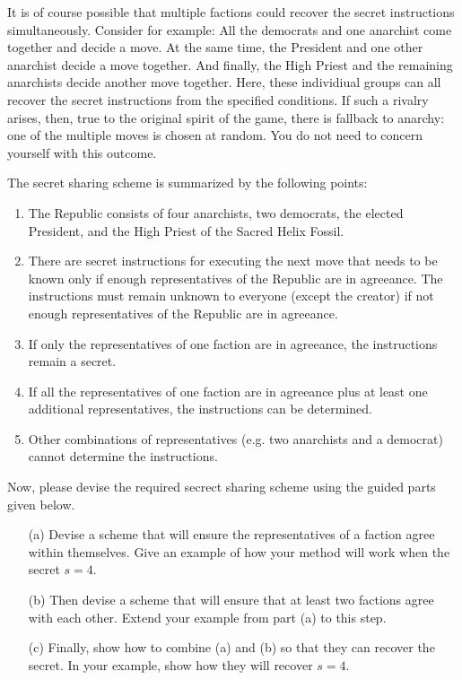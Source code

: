 \documentclass[]{article}
\begin{document}
\begin{qunlist}
It is of course possible that multiple factions could recover the secret instructions simultaneously.
Consider for example: All the democrats and one anarchist come together and decide a move. 
At the same time, the President and one other anarchist decide a move together. 
And finally, the High Priest and the remaining anarchists decide another move together. 
Here, these individiual groups can all recover the secret instructions from the specified conditions.
If such a rivalry arises, then, true to the original spirit of the game, there is fallback to anarchy: one of the multiple moves is chosen at random.
You do not need to concern yourself with this outcome.

The secret sharing scheme is summarized by the following points:

\begin{enumerate}
\item  The Republic consists of four anarchists, two democrats, the elected President, and the High Priest of the Sacred Helix Fossil.
\item  There are secret instructions for executing the next move that needs to be known only if enough representatives of the Republic are in agreeance. The instructions must remain unknown to everyone (except the creator) if not enough representatives of the Republic are in agreeance.
\item  If only the representatives of one faction are in agreeance, the instructions remain a secret.
\item  If all the representatives of one faction are in agreeance plus at least one additional representatives, the instructions can be determined.
\item  Other combinations of representatives (e.g. two anarchists and a democrat) cannot determine the instructions.
\end{enumerate}


Now, please devise the required secrect sharing scheme using the guided parts given below.

\begin{enumerate}
\qpart
\item[(a)] Devise a scheme that will ensure the representatives of a faction agree within themselves.  Give an example of how your method will work when the secret $s=4$.
\qpart
\item[(b)] Then devise a scheme that will ensure that at least two factions agree with each other. Extend your example from part (a) to this step.
\qpart
\item[(c)] Finally, show how to combine (a) and (b) so that they can recover the secret. In your example, show how they will recover $s=4$.
\end{enumerate}





\end{qunlist}
\end{document}
